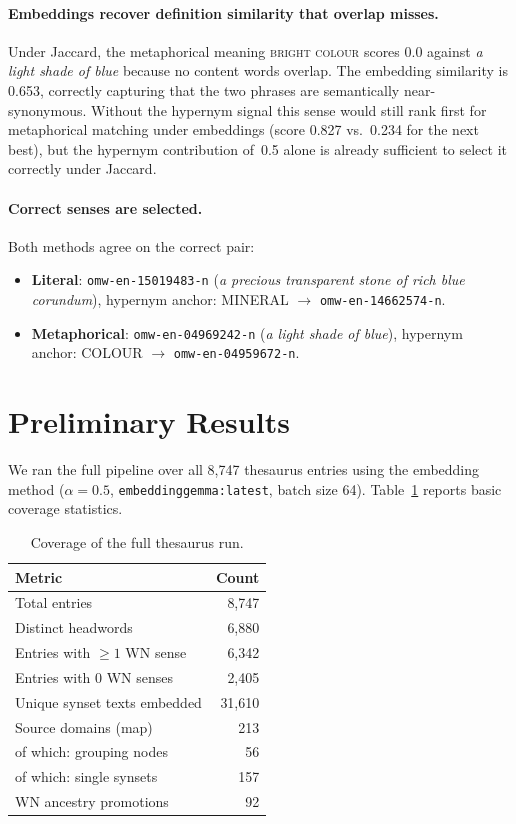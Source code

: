 \documentclass[11pt,a4paper]{article}
\begin{document}
\paragraph{Embeddings recover definition similarity that overlap misses.}
Under Jaccard, the metaphorical meaning \textsc{bright colour} scores 0.0
against \emph{a light shade of blue} because no content words overlap.
The embedding similarity is 0.653, correctly capturing that the two
phrases are semantically near-synonymous.
Without the hypernym signal this sense would still rank first for
metaphorical matching under embeddings (score 0.827 vs.\ 0.234 for the
next best), but the hypernym contribution of~0.5 alone is already
sufficient to select it correctly under Jaccard.

\paragraph{Correct senses are selected.}
Both methods agree on the correct pair:
\begin{itemize}
  \item \textbf{Literal}: \texttt{omw-en-15019483-n}
    (\emph{a precious transparent stone of rich blue corundum}),
    hypernym anchor: MINERAL $\to$ \texttt{omw-en-14662574-n}.
  \item \textbf{Metaphorical}: \texttt{omw-en-04969242-n}
    (\emph{a light shade of blue}),
    hypernym anchor: COLOUR $\to$ \texttt{omw-en-04959672-n}.
\end{itemize}

\section{Preliminary Results}
\label{sec:results}

We ran the full pipeline over all 8,747 thesaurus entries using the
embedding method ($\alpha = 0.5$, \texttt{embeddinggemma:latest},
batch size 64).
Table~\ref{tab:coverage} reports basic coverage statistics.

\begin{table}[ht]
\centering
\caption{Coverage of the full thesaurus run.}
\label{tab:coverage}
\begin{tabular}{lr}
\toprule
Metric & Count \\
\midrule
Total entries                  & 8,747 \\
Distinct headwords             & 6,880 \\
Entries with $\geq 1$ WN sense & 6,342 \\
Entries with 0 WN senses       & 2,405 \\
Unique synset texts embedded   & 31,610 \\
\midrule
Source domains (map)           &   213 \\
\quad of which: grouping nodes &    56 \\
\quad of which: single synsets &   157 \\
WN ancestry promotions         &    92 \\
\bottomrule
\end{tabular}
\end{table}
\end{document}
